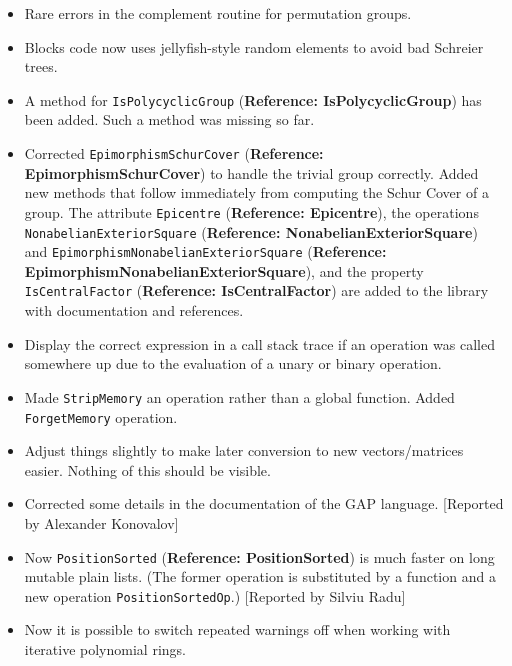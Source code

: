 \documentclass[a4paper,11pt]{report}
\begin{document}
{{\begin{itemize}
is needed for nearly all good methods for \texttt{PreImageElm}. This change adds such a new method for \texttt{IsInjective}. [Reported by Akos Seress] 
\item  Rare errors in the complement routine for permutation groups. 
\item  Blocks code now uses jellyfish-style random elements to avoid bad Schreier
trees. 
\item  A method for \texttt{IsPolycyclicGroup} (\textbf{Reference: IsPolycyclicGroup}) has been added. Such a method was missing so far. 
\item  Corrected \texttt{EpimorphismSchurCover} (\textbf{Reference: EpimorphismSchurCover}) to handle the trivial group correctly. Added new methods that follow
immediately from computing the Schur Cover of a group. The attribute \texttt{Epicentre} (\textbf{Reference: Epicentre}), the operations \texttt{NonabelianExteriorSquare} (\textbf{Reference: NonabelianExteriorSquare}) and \texttt{EpimorphismNonabelianExteriorSquare} (\textbf{Reference: EpimorphismNonabelianExteriorSquare}), and the property \texttt{IsCentralFactor} (\textbf{Reference: IsCentralFactor}) are added to the library with documentation and references. 
\item  Display the correct expression in a call stack trace if an operation was
called somewhere up due to the evaluation of a unary or binary operation. 
\item  Made \texttt{StripMemory} an operation rather than a global function. Added \texttt{ForgetMemory} operation. 
\item  Adjust things slightly to make later conversion to new vectors/matrices
easier. Nothing of this should be visible. 
\item  Corrected some details in the documentation of the \textsf{GAP} language. [Reported by Alexander Konovalov] 
\item  Now \texttt{PositionSorted} (\textbf{Reference: PositionSorted}) is much faster on long mutable plain lists. (The former operation is
substituted by a function and a new operation \texttt{PositionSortedOp}.) [Reported by Silviu Radu] 
\item  Now it is possible to switch repeated warnings off when working with iterative
polynomial rings. 
\end{itemize}
 }

  
}
\end{document}
